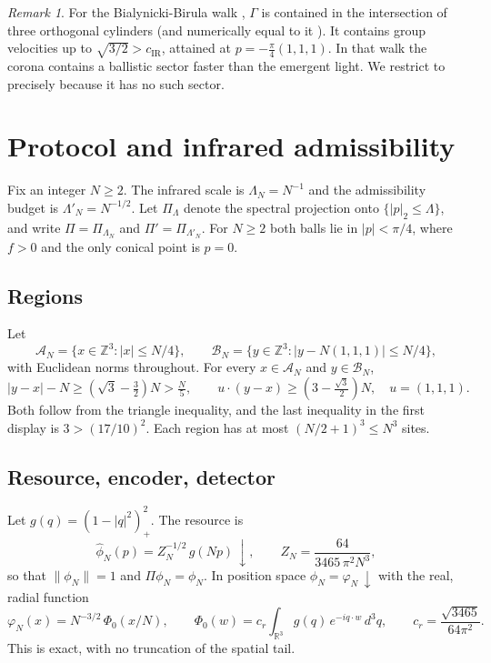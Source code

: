 \documentclass[11pt]{amsart}
\theoremstyle{definition}
\theoremstyle{remark}
\newtheorem{remark}[theorem]{Remark}
\newcommand{\Z}{\mathbb{Z}}
\newcommand{\R}{\mathbb{R}}
\newcommand{\cA}{\mathcal{A}}
\newcommand{\cB}{\mathcal{B}}
\newcommand{\dn}{{\downarrow}}
\newcommand{\cIR}{c_{\mathrm{IR}}}
\begin{document}
\begin{remark}
For the Bialynicki-Birula walk \cite[Eq.~(5.12)]{CJWW}, $\Gamma$ is contained
in the intersection of three orthogonal cylinders (and numerically equal to
it \cite[Fig.~5]{CJWW}).  It contains group velocities up to
$\sqrt{3/2}>\cIR$, attained at $p=-\frac\pi4(1,1,1)$.  In that walk the corona contains a ballistic sector
faster than the emergent light.  We restrict to \cite[Eq.~(5.15)]{CJWW}
precisely because it has no such sector.
\end{remark}

\section{Protocol and infrared admissibility}\label{sec:protocol}

Fix an integer $N\ge2$.  The infrared scale is $\Lambda_N=N^{-1}$ and the
admissibility budget is $\Lambda'_N=N^{-1/2}$.  Let $\Pi_\Lambda$ denote the
spectral projection onto $\{|p|_2\le\Lambda\}$, and write $\Pi=\Pi_{\Lambda_N}$
and $\Pi'=\Pi_{\Lambda'_N}$.  For $N\ge2$ both balls lie in $|p|<\pi/4$,
where $f>0$ and the only conical point is $p=0$.

\subsection{Regions}
Let
\[
\cA_N=\{x\in\Z^3:|x|\le N/4\},\qquad \cB_N=\{y\in\Z^3:|y-N(1,1,1)|\le N/4\},
\]
with Euclidean norms throughout.  For every $x\in\cA_N$ and $y\in\cB_N$,
\begin{equation}\label{eq:separation}
|y-x|-N\ge(\sqrt3-\tfrac32)N>\tfrac N5,
\qquad
u\cdot(y-x)\ge(3-\tfrac{\sqrt3}2)N,\quad u=(1,1,1).
\end{equation}
Both follow from the triangle inequality, and the last inequality in the
first display is $3>(17/10)^2$.  Each region has at most $(N/2+1)^3\le N^3$
sites.

\subsection{Resource, encoder, detector}
Let $g(q)=(1-|q|^2)_+^2$.  The resource is
\[
\hat\phi_N(p)=Z_N^{-1/2}\,g(Np)\,\dn,
\qquad Z_N=\frac{64}{3465\,\pi^2N^3},
\]
so that $\|\phi_N\|=1$ and $\Pi\phi_N=\phi_N$.  In position space
$\phi_N=\varphi_N\,\dn$ with the real, radial function
\begin{equation}\label{eq:resource}
\varphi_N(x)=N^{-3/2}\,\Phi_0(x/N),\qquad
\Phi_0(w)=c_r\int_{\R^3}g(q)\,e^{-iq\cdot w}\,d^3q,\qquad c_r=\frac{\sqrt{3465}}{64\pi^2}.
\end{equation}
This is exact, with no truncation of the spatial tail.
\end{document}
